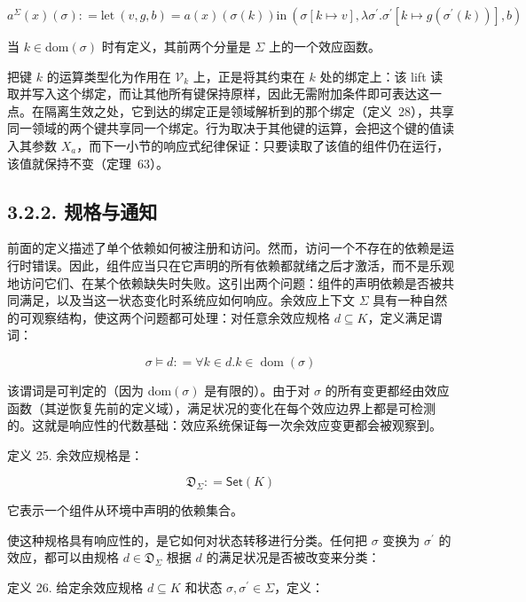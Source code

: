 \[
a ^ { \Sigma } ( x ) ( \sigma ) : = \mathrm { { l e t } } \ ( v , g , b ) = a ( x ) ( \sigma ( k ) ) \mathrm { { i n } } \ ( \sigma [ k \mapsto v ] , \lambda \sigma ^ { \prime } . \sigma ^ { \prime } [ k \mapsto g ( \sigma ^ { \prime } ( k ) ) ] , b )\tag{23}
\]

当 \(k \in \mathrm { d o m } ( \sigma )\) 时有定义，其前两个分量是 \(\Sigma\) 上的一个效应函数。

把键 \(k\) 的运算类型化为作用在 \(\mathcal { V } _ { k }\) 上，正是将其约束在 \(k\) 处的绑定上：该 lift 读取并写入这个绑定，而让其他所有键保持原样，因此无需附加条件即可表达这一点。在隔离生效之处，它到达的绑定正是领域解析到的那个绑定（定义~28），共享同一领域的两个键共享同一个绑定。行为取决于其他键的运算，会把这个键的值读入其参数 \(X _ { a }\)，而下一小节的响应式纪律保证：只要读取了该值的组件仍在运行，该值就保持不变（定理~63）。

\subsection{3.2.2. 规格与通知}\label{specification-and-notification}

前面的定义描述了单个依赖如何被注册和访问。然而，访问一个不存在的依赖是运行时错误。因此，组件应当只在它声明的所有依赖都就绪之后才激活，而不是乐观地访问它们、在某个依赖缺失时失败。这引出两个问题：组件的声明依赖是否被共同满足，以及当这一状态变化时系统应如何响应。余效应上下文 \(\Sigma\) 具有一种自然的可观察结构，使这两个问题都可处理：对任意余效应规格 \(d \subseteq K\)，定义满足谓词：

\[
\sigma \models d : = \forall k \in d . k \in \operatorname { d o m } ( \sigma )\tag{24}
\]

该谓词是可判定的（因为 dom\(( \sigma )\) 是有限的）。由于对 \(\sigma\) 的所有变更都经由效应函数（其逆恢复先前的定义域），满足状况的变化在每个效应边界上都是可检测的。这就是响应性的代数基础：效应系统保证每一次余效应变更都会被观察到。

定义 25. 余效应规格是：

\[
{ \mathfrak { D } } _ { \Sigma } : = { \mathsf { S e t } } ( K )\tag{25}
\]

它表示一个组件从环境中声明的依赖集合。

使这种规格具有响应性的，是它如何对状态转移进行分类。任何把 \(\sigma\) 变换为 \(\sigma ^ { \prime }\) 的效应，都可以由规格 \(d \in \mathfrak { D } _ { \Sigma }\) 根据 \(d\) 的满足状况是否被改变来分类：

定义 26. 给定余效应规格 \(d \subseteq K\) 和状态 \(\sigma , \sigma ^ { \prime } \in \Sigma\)，定义：

